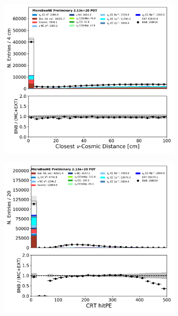 \begin{figure}[H]
    \centering
        \begin{subfigure}[b]{0.3\textwidth}
        \centering
        \includegraphics[width=\textwidth]{NuMuCCsel/Images/Ryan/appendix_presel_input_R3/_closestNuCosmicDist_07272020_samples_event_category.pdf}
        \end{subfigure}
        \begin{subfigure}[b]{0.3\textwidth}
        \centering
        \includegraphics[width=\textwidth]{NuMuCCsel/Images/Ryan/appendix_presel_input_R3/crthitpe_07262020_samples_event_category.pdf}

\end{subfigure}
\end{figure}
